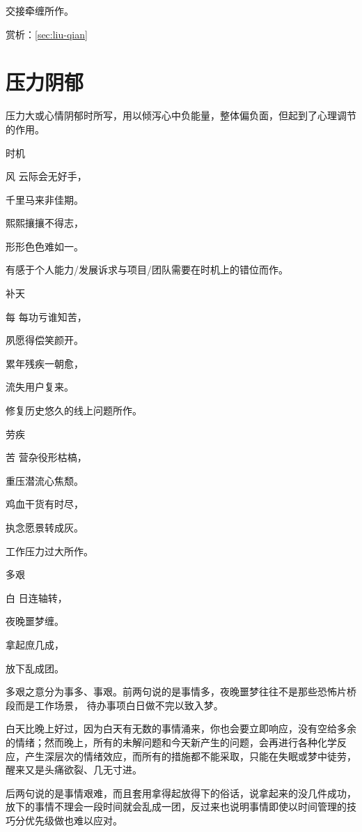 \documentclass{article}
\newenvironment{poem}[3]{
\begin{minipage}{\textwidth}
\begin{pinyinscope}\begin{center}\Large\linespread{1.4}\selectfont #2\end{center}\end{pinyinscope}
\begin{pinyinscope}
	\begin{center}
	\Large\linespread{1.4}\rmfamily\selectfont #3
}{\end{center}
\end{pinyinscope}
\end{minipage}
}
\begin{document}
交接牵缠所作。

赏析：\ref{sec:liu-qian}

\section{压力阴郁}

压力大或心情阴郁时所写，用以倾泻心中负能量，整体偏负面，但起到了心理调节的作用。

\begin{poem}{}{时机}
风云际会无好手，

千里马来非佳期。

熙熙攘攘不得志，

形形色色难如一。
\end{poem}

有感于个人能力/发展诉求与项目/团队需要在时机上的错位而作。

\begin{poem}{}{补天}
每每功亏谁知苦，

夙愿得偿笑颜开。

累年残疾一朝愈，

流失用户{}复来。
\end{poem}

修复历史悠久的线上问题所作。

\begin{poem}{}{劳疾}
苦营杂役形枯槁，

重压潜流心焦颓。

鸡血干货有时尽，

执念愿景转成灰。
\end{poem}

工作压力过大所作。

\begin{poem}{}{多艰}
白日连轴转，

夜晚噩梦缠。

拿起庶几成，

放下乱成团。
\end{poem}

多艰之意分为事多、事艰。前两句说的是事情多，夜晚噩梦往往不是那些恐怖片桥段而是工作场景， 待办事项白日做不完以致入梦。

白天比晚上好过，因为白天有无数的事情涌来，你也会要立即响应，没有空给多余的情绪；然而晚上，所有的未解问题和今天新产生的问题，会再进行各种化学反应，产生深层次的情绪效应，而所有的措施都不能采取，只能在失眠或梦中徒劳，醒来又是头痛欲裂、几无寸进。

后两句说的是事情艰难，而且套用拿得起放得下的俗话，说拿起来的没几件成功，放下的事情不理会一段时间就会乱成一团，反过来也说明事情即使以时间管理的技巧分优先级做也难以应对。
\end{document}
